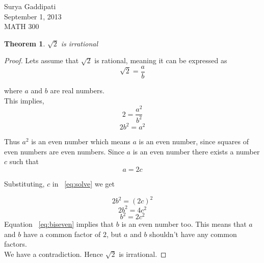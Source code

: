 \documentclass[12pt]{article}
\begin{document}
 

 Surya Gaddipati\\
September 1, 2013\\
MATH 300 

\newtheorem*{KL}{Theorem }

\begin{KL} 
$\sqrt 2$ is irrational 
\end{KL}
\begin{proof}
Lets assume that $\sqrt 2$ is rational, meaning  it can be expressed as 
\begin{equation}
  \sqrt{2} = \frac{a}{b}
\end{equation}

where $a$ and $b$ are real numbers.\\
This implies,
\begin{equation}
  2 = \frac{a^2}{b^2}
\end{equation}
\begin{equation}\label{eq:solve}
  2b^2 = a^2
\end{equation}

Thus $a^2$ is an even number which means $a$ is an even number, since squares of even numbers are even numbers.
Since $a$ is an even number there exists a number $c$ such that 
\begin{equation}
  a= 2c
\end{equation}

Substituting, $c$ in ~\ref{eq:solve} we get

\begin{equation}
  2b^2 = (2c)^2
\end{equation}
\begin{equation}
  2b^2 = 4c^2
\end{equation}
\begin{equation}\label{eq:biseven}
  b^2 = 2c^2
\end{equation}
Equation ~\ref{eq:biseven} implies that $b$ is an even number too. This means that $a$ and $b$ have a common factor of $2$, but $a$ and $b$ shouldn't have any common factors.\\
We have a contradiction. Hence $\sqrt 2$ is irrational.

\end{proof}
\end{document}

